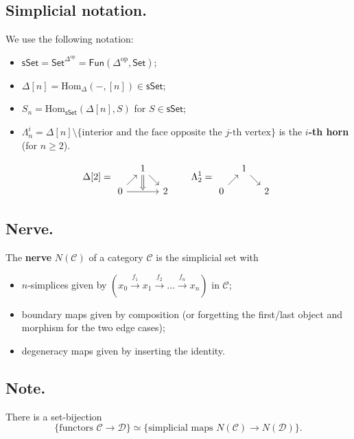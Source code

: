 \documentclass{article}
\numberwithin{equation}{subsection}
\renewcommand{\ss}[1]{\subsection{#1}}
\newcommand{\Hom}{\mathrm{Hom}}
\newcommand{\sset}{\mathsf{sSet}}
\newcommand{\C}{\mathcal{C}}
\newcommand{\D}{\mathcal{D}}
\begin{document}
        \ss{Simplicial notation.}
            We use the following notation:
            \begin{itemize}
                \item $\sset = \mathsf{Set}^{\Delta^\mathrm{op}} = \mathsf{Fun}(\Delta^\mathrm{op},\mathsf{Set})$;
                \item $\Delta[n] = \Hom_\Delta(-,[n])\in\sset$;
                \item $S_n = \Hom_\sset(\Delta[n],S)$ for $S\in\sset$;
                \item $\Lambda^i_n = \Delta[n]\setminus\{\text{interior and the face opposite the }j\text{-th vertex}\}$ is the \textbf{$i$-th horn} (for $n\geqslant2$).
            \end{itemize}
            \[
                \Delta[2] =
                \begin{tikzcd}[row sep=1em,column sep=1em]
                    &1\ar{dr}\ar[Rightarrow]{d}&\\
                    0\ar{ur}\ar{rr}&\,&2
                \end{tikzcd}
                \qquad\Lambda_2^1 =
                \begin{tikzcd}[row sep=1em,column sep=1em]
                    &1\ar{dr}&\\
                    0\ar{ur}&\,&2
                \end{tikzcd}
            \]

        \ss{Nerve.}
            The \textbf{nerve} $N(\C)$ of a category $\C$ is the simplicial set with
            \begin{itemize}
                \item $n$-simplices given by $(x_0\xrightarrow{f_1}x_1\xrightarrow{f_2}\ldots\xrightarrow{f_n}x_n)$ in $\C$;
                \item boundary maps given by composition (or forgetting the first/last object and morphism for the two edge cases);
                \item degeneracy maps given by inserting the identity.
            \end{itemize}

        \ss{Note.}
            There is a set-bijection
            \[
                \{\text{functors }\C\to\D\}\simeq\{\text{simplicial maps }N(\C)\to N(\D)\}.
            \]
\end{document}
